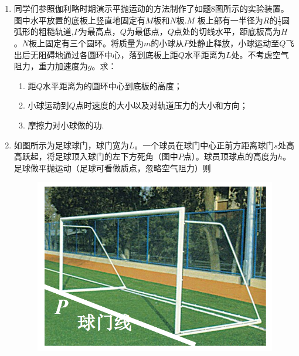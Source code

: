 \begin{enumerate}[leftmargin=0em]
\item 
{}
同学们参照伽利略时期演示平抛运动的方法制作了如题$ 8 $图所示的实验装置。图中水平放置的底板上竖直地固定有$ M $板和$ N $板.$ M $ 板上部有一半径为$ R $的$ \frac{ 1 }{ 4 } $圆弧形的粗糙轨道,$ P $为最高点，$ Q $为最低点，$ Q $点处的切线水平，距底板高为$ H $。$ N $板上固定有三个圆环。将质量为$ m $的小球从$ P $处静止释放，小球运动至$ Q $飞出后无阻碍地通过各圆环中心，落到底板上距$ Q $水平距离为$ L $处。不考虑空气阻力，重力加速度为$ g $。求：
\begin{enumerate}
\renewcommand{\labelenumi}{\arabic{enumi}.}
\item
距$ Q $水平距离为的圆环中心到底板的高度；
\item 
小球运动到$ Q $点时速度的大小以及对轨道压力的大小和方向；
\item 
摩擦力对小球做的功.

\end{enumerate}
\begin{figure}[h!]
\centering

\end{figure}




\item 
{}
如图所示为足球球门，球门宽为$ L $。一个球员在球门中心正前方距离球门$ s $处高高跃起，将足球顶入球门的左下方死角（图中$ P $点）。球员顶球点的高度为$ h $。足球做平抛运动（足球可看做质点，忽略空气阻力）则  
\begin{figure}
\centering
\includegraphics[width=0.3\linewidth]{picture/screenshot003}
\end{figure}


\end{enumerate}
